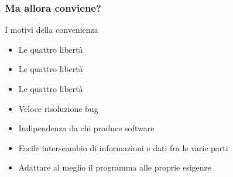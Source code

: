 \documentclass{beamer}
\begin{document}
\begin{frame}
  \frametitle{Ma allora conviene?}


  \begin{block}{I motivi della convenienza}
    
    \begin{itemize}
      \item<1-> Le quattro libert\`a
      \item<2-> Le quattro libert\`a
      \item<3-> Le quattro libert\`a
      \item<4-> Veloce risoluzione bug
      \item<5-> Indipendenza da chi produce software
      \item<6-> Facile interscambio di informazioni e dati fra le
        varie parti
      \item<7-> Adattare al meglio il programma alle proprie esigenze
    \end{itemize}

  \end{block}
  
\end{frame}




    




\end{document}
